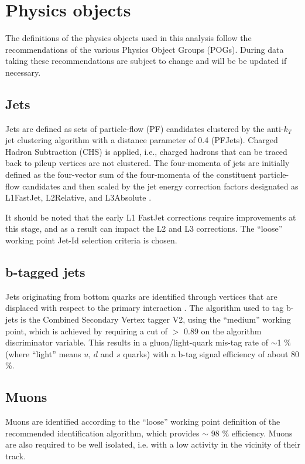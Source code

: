\section{Physics objects}
\label{sec:objects}
The definitions of the physics objects used in this analysis follow the recommendations of the various Physics Object Groups (POGs). 
During data taking these recommendations are subject to change and will be be updated if necessary.

\subsection{Jets}
\label{sec:jetreco}
Jets are defined as sets of particle-flow (PF) candidates clustered by the
anti-$k_{T}$ jet clustering algorithm \cite{Cacciari:2008gp} with a distance parameter of 0.4
(PFJets). Charged Hadron Subtraction (CHS) is applied, i.e., charged
hadrons that can be traced back to pileup vertices are not clustered.
The four-momenta of jets are initially defined as the four-vector sum of
the four-momenta of the constituent particle-flow candidates and then
scaled by the jet energy correction factors designated as L1FastJet,
L2Relative, and L3Absolute \cite{Chatrchyan:2011ds}.

It should be noted that the early L1 FastJet corrections require
improvements at this stage, and as a result can impact the L2 and L3
corrections. The ``loose'' working point Jet-Id selection criteria is
chosen.

\subsection{b-tagged jets}
\label{sec:btags}
Jets originating from bottom quarks are identified through vertices that are displaced with respect to the primary interaction \cite{Chatrchyan:2012jua}. The algorithm used to tag b-jets is the Combined Secondary Vertex tagger V2, using the ``medium'' working point, which is achieved by requiring a cut of $>$ 0.89 on the algorithm discriminator variable. 
This results in a gluon/light-quark mis-tag rate of $\sim$1 \% (where ``light'' means $u$, $d$ and $s$ quarks) with a b-tag signal efficiency of about 80 \%. 


\subsection{Muons}
\label{sec:muon-id}
Muons are identified according to the ``loose'' working point definition of the recommended identification algorithm, which provides $\sim$ 98 $\%$ efficiency. 
Muons are also required to be well isolated, i.e. with a low activity in the vicinity of their track. 

